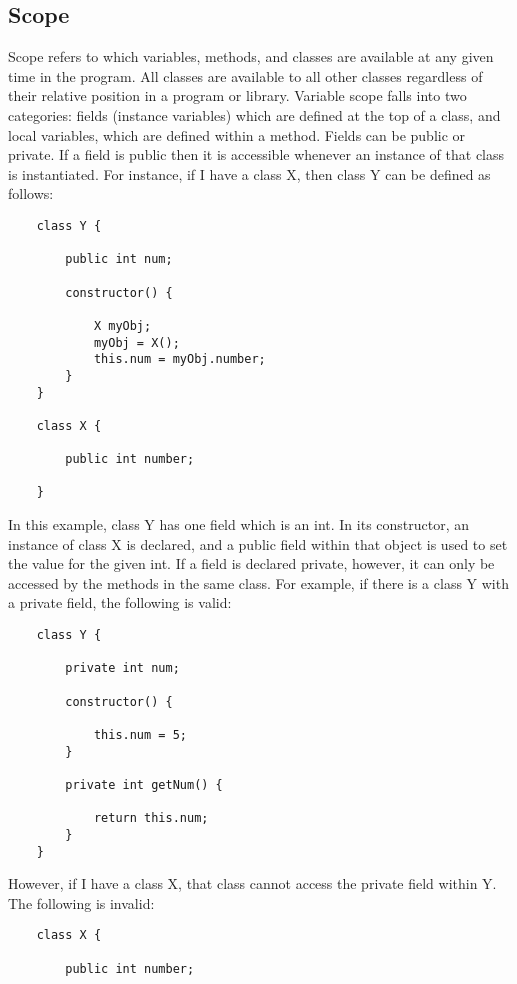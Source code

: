 \begin{homeworkProblem}
	
	\section{Scope}
		
		
	Scope refers to which variables, methods, and classes are available at any given time in the program. All classes are available to all other classes regardless of their relative position in a program or library. Variable scope falls into two categories: fields (instance variables) which are defined at the top of a class, and local variables, which are defined within a method. Fields can be public or private. If a field is public then it is accessible whenever an instance of that class is instantiated. For instance, if I have a class X, then class Y can be defined as follows:
	
	\begin{verbatim}
	class Y {
		
		public int num;
		
		constructor() {
			
			X myObj;
			myObj = X();
			this.num = myObj.number;
		}
	}
	
	class X {
		
		public int number;
		
	}
	\end{verbatim}
	
	In this example, class Y has one field which is an int. In its constructor, an instance of class X is declared, and a public field within that object is used to set the value for the given int. If a field is declared private, however, it can only be accessed by the methods in the same class. For example, if there is a class Y with a private field, the following is valid:
	
	\begin{verbatim}
	class Y {
		
		private int num;
		
		constructor() {
			
			this.num = 5;
		}
		
		private int getNum() {
			
			return this.num;
		}
	}
	\end{verbatim}
		
		However, if I have a class X, that class cannot access the private field within Y. The following is invalid:
	\begin{verbatim}
	class X {
	
		public int number;
	

\end{verbatim}
\end{homeworkProblem}
